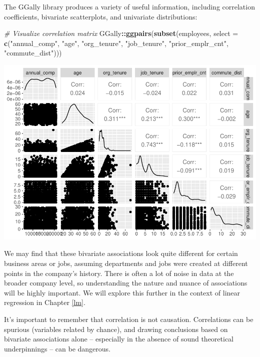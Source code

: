 \documentclass[]{book}
\newenvironment{Shaded}{\begin{snugshade}}{\end{snugshade}}
\newcommand{\CommentTok}[1]{\textcolor[rgb]{0.56,0.35,0.01}{\textit{#1}}}
\newcommand{\DataTypeTok}[1]{\textcolor[rgb]{0.13,0.29,0.53}{#1}}
\newcommand{\KeywordTok}[1]{\textcolor[rgb]{0.13,0.29,0.53}{\textbf{#1}}}
\newcommand{\NormalTok}[1]{#1}
\newcommand{\OperatorTok}[1]{\textcolor[rgb]{0.81,0.36,0.00}{\textbf{#1}}}
\newcommand{\StringTok}[1]{\textcolor[rgb]{0.31,0.60,0.02}{#1}}
\begin{document}
The GGally library produces a variety of useful information, including correlation coefficients, bivariate scatterplots, and univariate distributions:

\begin{Shaded}
\begin{Highlighting}[]
\CommentTok{# Visualize correlation matrix}
\NormalTok{GGally}\OperatorTok{::}\KeywordTok{ggpairs}\NormalTok{(}\KeywordTok{subset}\NormalTok{(employees, }\DataTypeTok{select =} \KeywordTok{c}\NormalTok{(}\StringTok{"annual_comp"}\NormalTok{, }\StringTok{"age"}\NormalTok{, }\StringTok{"org_tenure"}\NormalTok{, }\StringTok{"job_tenure"}\NormalTok{, }\StringTok{"prior_emplr_cnt"}\NormalTok{, }\StringTok{"commute_dist"}\NormalTok{)))}
\end{Highlighting}
\end{Shaded}

\includegraphics{The_People_Analytics_Companion_files/figure-latex/unnamed-chunk-83-1.pdf}

We may find that these bivariate associations look quite different for certain business areas or jobs, assuming departments and jobs were created at different points in the company's history. There is often a lot of noise in data at the broader company level, so understanding the nature and nuance of associations will be highly important. We will explore this further in the context of linear regression in Chapter \ref{lm}.

It's important to remember that correlation is not causation. Correlations can be spurious (variables related by chance), and drawing conclusions based on bivariate associations alone -- especially in the absence of sound theoretical underpinnings -- can be dangerous.
\end{document}
